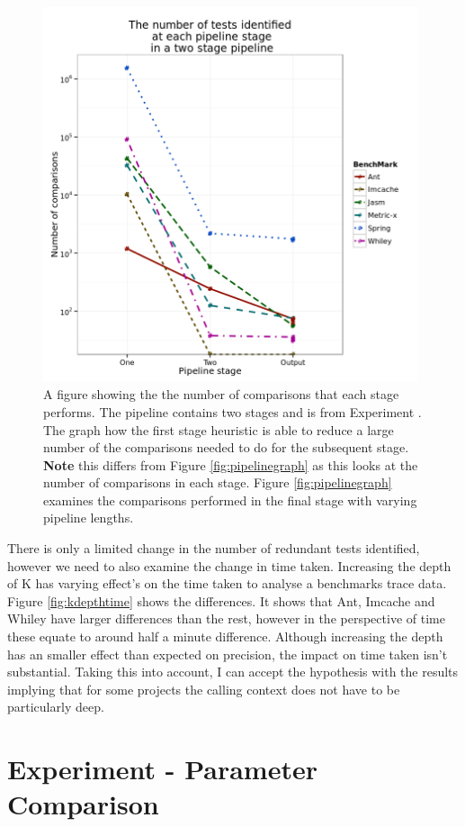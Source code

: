 \begin{figure}[h]
\centering
\includegraphics[width=\textwidth,height=11cm]{stagesinpipeline.png}
\caption{A figure showing the the number of comparisons that each stage performs. The pipeline contains two stages and is from Experiment . The graph how the first stage heuristic is able to reduce a large number of the comparisons needed to do for the subsequent stage. \textbf{Note} this differs from Figure \ref{fig:pipelinegraph} as this looks at the number of comparisons in each stage. Figure \ref{fig:pipelinegraph} examines the comparisons performed in the final stage with varying pipeline lengths.}
\label{fig:stagesinpipeline}
\end{figure}

There is only a limited change in the number of redundant tests identified, however we need to also examine the change in time taken. Increasing the depth of K has varying effect's on the time taken to analyse a benchmarks trace data. Figure \ref{fig:kdepthtime} shows the differences. It shows that Ant, Imcache and Whiley have larger differences than the rest, however in the perspective of time these equate to around half a minute difference. Although increasing the depth has an smaller effect than expected on precision, the impact on time taken isn't substantial. Taking this into account, I can accept the hypothesis with the results implying that for some projects the calling context does not have to be particularly deep. 

\section{Experiment  - Parameter Comparison}
\label{sec:param}

